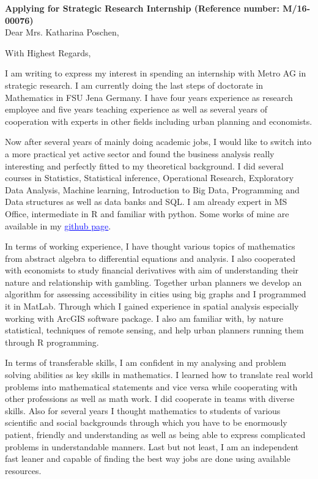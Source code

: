 \documentclass[11pt,a4paper,sans]{moderncv}        %
\title{}                               %
\begin{document}
\date{May 17, 2016}
\opening{\textbf{Applying for  Strategic Research Internship (Reference number: M/16-00076)}\\Dear Mrs. Katharina Poschen,}
\closing{With Highest Regards,}
\makelettertitle

I am writing to express my interest in spending an internship with Metro AG in strategic research. I am currently doing the last steps of doctorate in Mathematics in FSU Jena Germany. I have four years experience as research employee and five years teaching experience as well as several years of cooperation with experts in other fields including urban planning and economists.

Now after several years of mainly doing academic jobs, I would like to switch into a more practical yet active sector and found the business analysis really interesting and perfectly fitted to my theoretical background. I did several courses in Statistics, Statistical inference, Operational Research, Exploratory Data Analysis,  Machine learning, Introduction to Big Data, Programming and Data structures as well as data banks and SQL. I am already expert in MS Office, intermediate in R and familiar with python. Some works of mine are available in my  \href{https://github.com/srhumir}{\textcolor{blue}{\underline{github page}}}. 

In terms of working experience, I have thought various topics of mathematics from abstract algebra to differential equations and analysis. I also cooperated with economists to study financial derivatives with aim of understanding their nature and relationship with gambling. Together urban planners we develop an algorithm for assessing accessibility in cities using big graphs and I programmed it in MatLab. Through which I gained experience in spatial analysis especially working with ArcGIS software package. I also am familiar with, by nature statistical, techniques of remote sensing, and help urban planners running them through R programming.

In terms of transferable skills, I am confident in my analysing and problem solving abilities as key skills in mathematics. I learned how to translate real world problems into mathematical statements and vice versa while cooperating with other professions as well as math work. I did cooperate in teams with diverse skills. Also for several years I thought mathematics to students of various scientific and social backgrounds through which you have to be enormously patient, friendly and understanding as well as being able to express complicated problems in understandable manners. Last but not least, I am an independent fast leaner and capable of finding the best way jobs are done using available resources.
\end{document}
